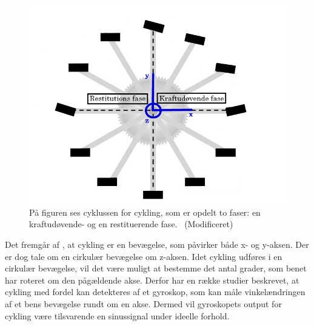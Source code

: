 \begin{figure}[H]
	\centering
	\includegraphics[scale=0.4]{figures/bProblemloesning/cykel_cyklus.png}
	\caption{På figuren ses cyklussen for cykling, som er opdelt to faser: en kraftudøvende- og en restituerende fase.~\citep{Springer2014} (Modificeret)}
	\label{fig:cykel_cyklus}
\end{figure}\vspace{-0.25cm}
Det fremgår af , at cykling er en bevægelse, som påvirker både x- og y-aksen. Der er dog tale om en cirkulær bevægelse om z-aksen. Idet cykling udføres i en cirkulær bevægelse, vil det være muligt at bestemme det antal grader, som benet har roteret om den pågældende akse. Derfor har en række studier beskrevet, at cykling med fordel kan detekteres af et gyroskop, som kan måle vinkelændringen af et bens bevægelse rundt om en akse. Dermed vil gyroskopets output for cykling være tilsvarende en sinussignal under ideelle forhold.~\citep{Cockcroft2011,Marin-PerianuMarin-Perianu2013} 

